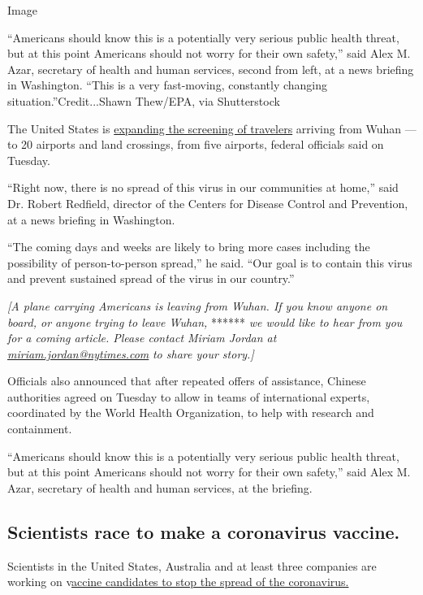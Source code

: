 Image

``Americans should know this is a potentially very serious public health
threat, but at this point Americans should not worry for their own
safety,'' said Alex M. Azar, secretary of health and human services,
second from left, at a news briefing in Washington. ``This is a very
fast-moving, constantly changing situation.''Credit...Shawn Thew/EPA,
via Shutterstock

The United States is
\href{https://www.nytimes.com/2020/01/28/health/airports-screening-coronavirus.html}{expanding
the screening of travelers} arriving from Wuhan --- to 20 airports and
land crossings, from five airports, federal officials said on Tuesday.

``Right now, there is no spread of this virus in our communities at
home,'' said Dr. Robert Redfield, director of the Centers for Disease
Control and Prevention, at a news briefing in Washington.

``The coming days and weeks are likely to bring more cases including the
possibility of person-to-person spread,'' he said. ``Our goal is to
contain this virus and prevent sustained spread of the virus in our
country.''

\emph{{[}A plane carrying Americans is leaving from Wuhan. If you know
anyone on board, or anyone trying to leave Wuhan,} ****** \emph{we would
like to hear from you for a coming article. Please contact Miriam Jordan
at}
\href{mailto:miriam.jordan@nytimes.com}{\emph{miriam.jordan@nytimes.com}}
\emph{to share your story.{]}}

Officials also announced that after repeated offers of assistance,
Chinese authorities agreed on Tuesday to allow in teams of international
experts, coordinated by the World Health Organization, to help with
research and containment.

``Americans should know this is a potentially very serious public health
threat, but at this point Americans should not worry for their own
safety,'' said Alex M. Azar, secretary of health and human services, at
the briefing.

\hypertarget{scientists-race-to-make-a-coronavirus-vaccine}{%
\subsection{Scientists race to make a coronavirus
vaccine.}\label{scientists-race-to-make-a-coronavirus-vaccine}}

Scientists in the United States, Australia and at least three companies
are working on
v\href{https://www.nytimes.com/2020/01/28/health/coronavirus-vaccine.html}{accine
candidates to stop the spread of the coronavirus.}

